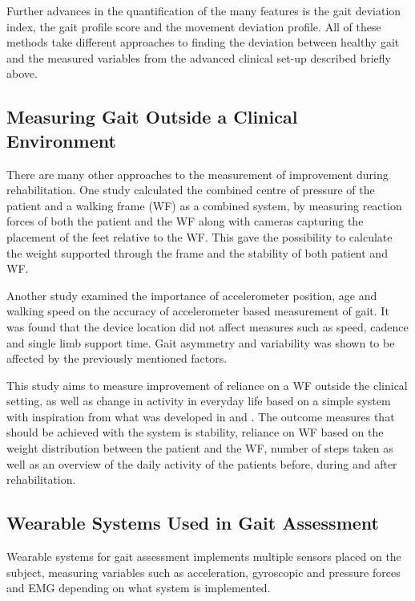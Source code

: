 Further advances in the quantification of the many features is the gait deviation index, the gait profile score and the movement deviation profile. All of these methods take different approaches to finding the deviation between healthy gait and the measured variables from the advanced clinical set-up described briefly above. \cite{Sandrini2018}

\subsection{Measuring Gait Outside a Clinical Environment}

There are many other approaches to the measurement of improvement during rehabilitation. One study calculated the combined centre of pressure of the patient and a walking frame (WF) as a combined system, by measuring reaction forces of both the patient and the WF along with cameras capturing the placement of the feet relative to the WF. This gave the possibility to calculate the weight supported through the frame and the stability of both patient and WF. \cite{Costamanga2017}

Another study examined the importance of accelerometer position, age and walking speed on the accuracy of accelerometer based measurement of gait. It was found that the device location did not affect measures such as speed, cadence and single limb support time. Gait asymmetry and variability was shown to be affected by the previously mentioned factors. \cite{Hurwitz2016}

This study aims to measure improvement of reliance on a WF outside the clinical setting, as well as change in activity in everyday life based on a simple system with inspiration from what was developed in \cite{Costamanga2017} and \cite{Hurwitz2016}. The outcome measures that should be achieved with the system is stability, reliance on WF based on the weight distribution between the patient and the WF, number of steps taken as well as an overview of the daily activity of the patients before, during and after rehabilitation.

\subsection{Wearable Systems Used in Gait Assessment}

Wearable systems for gait assessment implements multiple sensors placed on the subject, measuring variables such as acceleration, gyroscopic and pressure forces and EMG depending on what system is implemented. \cite{Muro2014}

